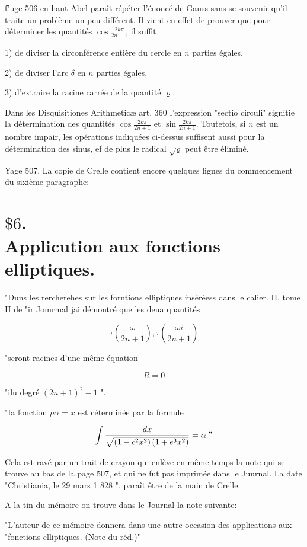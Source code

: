 \documentclass{article}
\begin{document}
f'uge 506 en haut Abel paraît répéter l'énoncé de Gauss sans se souvenir qu'il traite un problème un peu différent. Il vient en effet de prouver que pour déterminer les quantités \(\cos \frac{2 k \pi}{2 n+1}\) il suffit

1) de diviser la circonférence entière du cercle en \(n\) parties égales,

2) de diviser l'arc \(\delta\) en \(n\) parties égales,

3) d'extraire la racine carrée de la quantité \(\varrho\).

Dans les Disquisitiones Arithmeticæ art. 360 l'expression "sectio circuli" signitie la détermination des quantités \(\cos \frac{2 k \pi}{2 n+1}\) et \(\sin \frac{2 k \pi}{2 n+1}\). Toutetois, si \(n\) est un nombre impair, les opérations indiquées ci-dessus suffisent aussi pour la détermination des sinus, ef de plus le radical \(\sqrt{\varrho}\) peut être éliminé.

Yage 507. La copie de Crelle contient encore quelques lignes du commencement du sixième paragraphe:

\section*{\(\$ 6\). \\ Applicution aux fonctions elliptiques.}

"Duns les rercherehes sur les forntions elliptiques inséréess dans le calier. II, tome II de "ir Jomrmal jai démontré que les deua quantités

\[
\tau\left(\frac{\omega}{2 n+1}\right), \tau\left(\frac{\dot{\omega} i}{2 n+1}\right)
\]

"seront racines d'une même équation

\[
R=0
\]

"ilu degré \((2 n+1)^{2}-1\) ".

"Ia fonction \(p \alpha=x\) est céterminée par la formule

\[
\int \frac{d x}{\sqrt{\left(1-c^{2} x^{2}\right)\left(1+e^{3} x^{2}\right)}}=\alpha . "
\]

Cela est ravé par un trait de crayon qui enlève en même temps la note qui se trouve au bas de la page 507, et qui ne fut pas imprimée dans le Juurnal. La date "Christiania, le 29 mars 1 828 ", paraît être de la main de Crelle.

A la tin du mémoire on trouve dans le Journal la note suivante:

"L'auteur de ce mémoire donnera dans une autre occasion des applications aux "fonctions elliptiques. (Note du réd.)"
\end{document}
